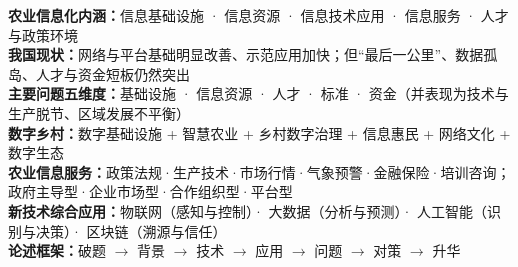 \documentclass[a4paper,11pt]{article}
\begin{document}

\begin{knowmap}
\textbf{农业信息化内涵：}信息基础设施 · 信息资源 · 信息技术应用 · 信息服务 · 人才与政策环境\\[2pt]
\textbf{我国现状：}网络与平台基础明显改善、示范应用加快；但“最后一公里”、数据孤岛、人才与资金短板仍然突出\\[2pt]
\textbf{主要问题五维度：}基础设施 · 信息资源 · 人才 · 标准 · 资金（并表现为技术与生产脱节、区域发展不平衡）\\[2pt]
\textbf{数字乡村：}数字基础设施 + 智慧农业 + 乡村数字治理 + 信息惠民 + 网络文化 + 数字生态\\[2pt]
\textbf{农业信息服务：}政策法规·生产技术·市场行情·气象预警·金融保险·培训咨询；政府主导型·企业市场型·合作组织型·平台型\\[2pt]
\textbf{新技术综合应用：}物联网（感知与控制）· 大数据（分析与预测）· 人工智能（识别与决策）· 区块链（溯源与信任）\\[2pt]
\textbf{论述框架：}破题 $\rightarrow$ 背景 $\rightarrow$ 技术 $\rightarrow$ 应用 $\rightarrow$ 问题 $\rightarrow$ 对策 $\rightarrow$ 升华
\end{knowmap}
\end{document}
